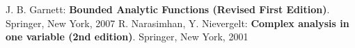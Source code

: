 \begin{thebibliography}{widest entry}
   J. B. Garnett: \textbf{Bounded Analytic Functions (Revised First Edition)}. Springer, New York, 2007
   R. Narasimhan, Y. Nievergelt: \textbf{Complex analysis in one variable (2nd edition)}. Springer, New York, 2001
\end{thebibliography}
